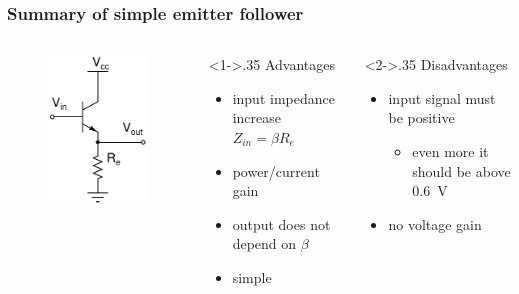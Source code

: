 \documentclass[beamer]{standalone}
\begin{document}
\frame
{ \frametitle{Summary of simple emitter follower}
\begin{columns}[c]
	\begin{column}{.3\textwidth}
		\begin{figure}
			\includegraphics[height=0.60\textheight]{./schematics/npn_emitter_follower}
		\end{figure}
	\end{column}
	\begin{column}<1->{.35\textwidth}
		Advantages
		\begin{itemize}
			\item input impedance increase $Z_{in}=\beta R_e$
			\item power/current gain
			\item output does not depend on $\beta$
			\item simple
		\end{itemize}

	\end{column}
	\begin{column}<2->{.35\textwidth}
		Disadvantages
		\begin{itemize}
			\item input signal must be positive
				\begin{itemize}
					\item even more it should be above 0.6~V
				\end{itemize}
			\item \alert{no voltage gain}
		\end{itemize}
	\end{column}
\end{columns}
	}
	
\end{document}
